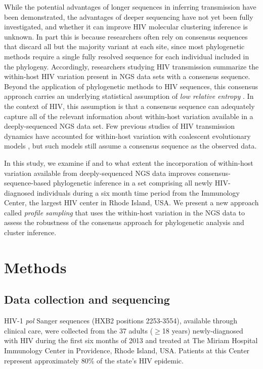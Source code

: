 \documentclass[letterpaper]{article}
\begin{document}
While the potential advantages of longer sequences in inferring transmission have been demonstrated, the advantages of deeper sequencing have not yet been fully investigated, and whether it can improve HIV molecular clustering inference is unknown. In part this is because researchers often rely on consensus sequences that discard all but the majority variant at each site, since most phylogenetic methods require a single fully resolved sequence for each individual included in the phylogeny. Accordingly, researchers studying HIV transmission summarize the within-host HIV variation present in NGS data sets with a consensus sequence. Beyond the application of phylogenetic methods to HIV sequences, this consensus approach carries an underlying statistical assumption of \emph{low relative entropy} \parencite{guang}. In the context of HIV, this assumption is that a consensus sequence can adequately capture all of the relevant information about within-host variation available in a deeply-sequenced NGS data set. Few previous studies of HIV transmission dynamics have accounted for within-host variation with coalescent evolutionary models \parencite{giardina, romero-severson}, but such models still assume a consensus sequence as the observed data.

In this study, we examine if and to what extent the incorporation of within-host variation available from deeply-sequenced NGS data improves consensus-sequence-based phylogenetic inference in a set comprising all newly HIV-diagnosed individuals during a six month time period from the Immunology Center, the largest HIV center in Rhode Island, USA. We present a new approach called \emph{profile sampling} that uses the within-host variation in the NGS data to assess the robustness of the consensus approach for phylogenetic analysis and cluster inference.

\section*{Methods}

\subsection*{Data collection and sequencing}

HIV-1 \emph{pol} Sanger sequences (HXB2 positions 2253-3554), available through clinical care, were collected from the 37 adults ($\geq$18 years) newly-diagnosed with HIV during the first six months of 2013 and treated at The Miriam Hospital Immunology Center in Providence, Rhode Island, USA. Patients at this Center represent approximately 80\% of the state's HIV epidemic.
\end{document}
